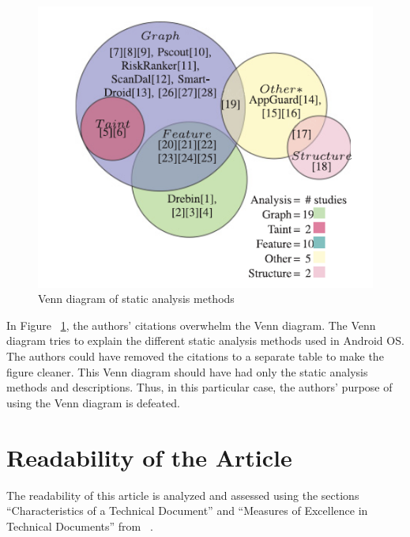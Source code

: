 \documentclass[letterpaper,10pt]{texMemo}
\begin{document}
\begin{figure}[h!]
        \centerline{\includegraphics[scale=0.45]{venn_diagram.PNG}}
        \caption{Venn diagram of static analysis methods ~\cite[fig 3 b]{Tam:2017:EAM:3022634.3017427}}
        \label{lbl_venn}
\end{figure}
In Figure ~\ref{lbl_venn}, the authors' citations overwhelm the Venn diagram. The Venn diagram tries to explain the different static analysis methods used in Android OS. The authors could have removed the citations to a separate table to make the figure cleaner. This Venn diagram should have had only the static analysis methods and descriptions. Thus, in this particular case, the authors' purpose of using the Venn diagram is defeated.\\

\section*{Readability of the Article}
        The readability of this article is analyzed and assessed using the sections \enquote{Characteristics of a Technical Document} and \enquote{Measures of Excellence in Technical Documents} from ~\cite{markel_selber_2019_intro}.
\end{document}
